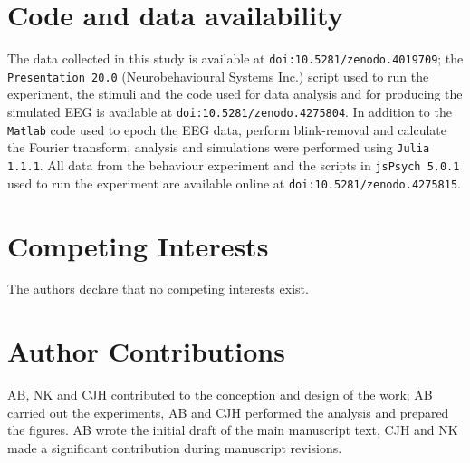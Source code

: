 \documentclass[10pt,letterpaper]{article}
\begin{document}
\section*{Code and data availability}
The data collected in this study is available at
\texttt{doi:10.5281/zenodo.4019709}; the \texttt{Presentation 20.0}
(Neurobehavioural Systems Inc.) script used to run the experiment, the
stimuli and the code used for data analysis and for producing the
simulated EEG is available at \texttt{doi:10.5281/zenodo.4275804}. In
addition to the \texttt{Matlab} code used to epoch the EEG data,
perform blink-removal and calculate the Fourier transform, analysis
and simulations were performed using \texttt{Julia 1.1.1}. All data
from the behaviour experiment and the scripts in \texttt{jsPsych
  5.0.1} used to run the experiment are available online at
\texttt{doi:10.5281/zenodo.4275815}.

\section*{Competing Interests}
The authors declare that no competing interests exist.

{}

\section*{Author Contributions}
AB, NK and CJH contributed to the conception and design of the work;
AB carried out the experiments, AB and CJH performed the analysis and
prepared the figures. AB wrote the initial draft of the main
manuscript text, CJH and NK made a significant contribution during
manuscript revisions.
\end{document}
